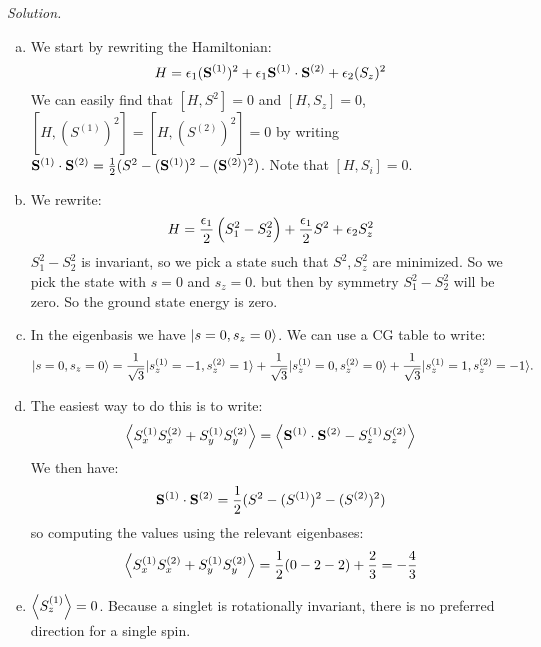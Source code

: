 \noindent
\textit{Solution.} 
\begin{enumerate}[(a)]
    \item We start by rewriting the Hamiltonian:
    \begin{equation}
        H = \epsilon_1 (\mathbf{S}^{(1)})^2 + \epsilon_1\mathbf{S}^{(1)} \cdot \mathbf{S}^{(2)} + \epsilon_2 (S_z)^2
    \end{equation}
    We can easily find that $[H, S^2] = 0$ and $[H, S_z] = 0$, $[H, (S^{(1)})^2] = [H, (S^{(2)})^2] = 0$ by writing $\mathbf{S}^{(1)} \cdot \mathbf{S}^{(2)} = \frac{1}{2}(S^2 - (\mathbf{S}^{(1)})^2 - (\mathbf{S}^{(2)})^2)$. Note that $[H, S_i] = 0$. 
    \item We rewrite:
    \begin{equation}
        H = \frac{\epsilon_1}{2}\left(S_1^2 - S_2^2\right) + \frac{\epsilon_1}{2}S^2 + \epsilon_2 S_z^2
    \end{equation}
    $S_1^2 - S_2^2$ is invariant, so we pick a state such that $S^2, S_z^2$ are minimized. So we pick the state with $s = 0$ and $s_z = 0$. but then by symmetry $S_1^2 - S_2^2$ will be zero. So the ground state energy is zero.
    \item In the eigenbasis we have $\lvert s = 0, s_z = 0 \rangle$. We can use a CG table to write:
    \begin{equation}
        \lvert s = 0, s_z = 0 \rangle = \frac{1}{\sqrt{3}}\lvert s_z^{(1)} = -1, s_z^{(2)} = 1 \rangle + \frac{1}{\sqrt{3}}\lvert s_z^{(1)} = 0, s_z^{(2)} = 0 \rangle + \frac{1}{\sqrt{3}}\lvert s_z^{(1)} = 1, s_z^{(2)} = -1 \rangle.
    \end{equation}
    \item The easiest way to do this is to write:
    \begin{equation}
        \left< S_x^{(1)}S_x^{(2)} + S_y^{(1)}S_y^{(2)} \right> = \left< \mathbf{S}^{(1)} \cdot \mathbf{S}^{(2)} - S_z^{(1)}S_z^{(2)} \right>
    \end{equation}
    We then have:
    \begin{equation}
        \mathbf{S}^{(1)} \cdot \mathbf{S}^{(2)} = \frac{1}{2}(S^2 - (S^{(1)})^2 - (S^{(2)})^2)
    \end{equation}
    so computing the values using the relevant eigenbases:
    \begin{equation}
        \left< S_x^{(1)}S_x^{(2)} + S_y^{(1)}S_y^{(2)} \right> = \frac{1}{2}(0 - 2 - 2) + \frac{2}{3} = -\frac{4}{3}
    \end{equation}
    \item $\left< S_z^{(1)} \right> = 0$. Because a singlet is rotationally invariant, there is no preferred direction for a single spin.
\end{enumerate}


